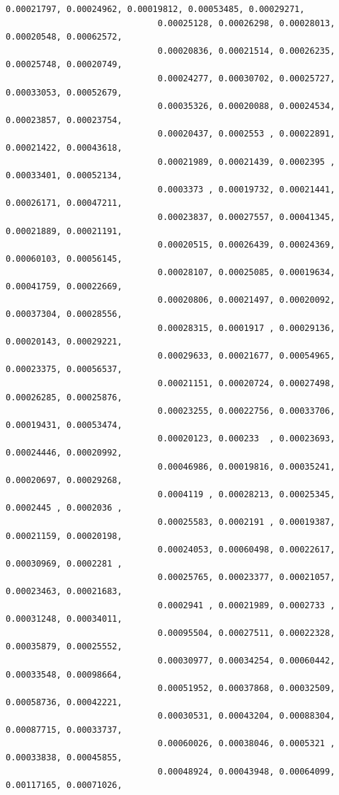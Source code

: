 \documentclass[11pt]{article}
\begin{document}
\begin{Verbatim}[commandchars=\\\{\}]
                              0.00021797, 0.00024962, 0.00019812, 0.00053485, 0.00029271,
                              0.00025128, 0.00026298, 0.00028013, 0.00020548, 0.00062572,
                              0.00020836, 0.00021514, 0.00026235, 0.00025748, 0.00020749,
                              0.00024277, 0.00030702, 0.00025727, 0.00033053, 0.00052679,
                              0.00035326, 0.00020088, 0.00024534, 0.00023857, 0.00023754,
                              0.00020437, 0.0002553 , 0.00022891, 0.00021422, 0.00043618,
                              0.00021989, 0.00021439, 0.0002395 , 0.00033401, 0.00052134,
                              0.0003373 , 0.00019732, 0.00021441, 0.00026171, 0.00047211,
                              0.00023837, 0.00027557, 0.00041345, 0.00021889, 0.00021191,
                              0.00020515, 0.00026439, 0.00024369, 0.00060103, 0.00056145,
                              0.00028107, 0.00025085, 0.00019634, 0.00041759, 0.00022669,
                              0.00020806, 0.00021497, 0.00020092, 0.00037304, 0.00028556,
                              0.00028315, 0.0001917 , 0.00029136, 0.00020143, 0.00029221,
                              0.00029633, 0.00021677, 0.00054965, 0.00023375, 0.00056537,
                              0.00021151, 0.00020724, 0.00027498, 0.00026285, 0.00025876,
                              0.00023255, 0.00022756, 0.00033706, 0.00019431, 0.00053474,
                              0.00020123, 0.000233  , 0.00023693, 0.00024446, 0.00020992,
                              0.00046986, 0.00019816, 0.00035241, 0.00020697, 0.00029268,
                              0.0004119 , 0.00028213, 0.00025345, 0.0002445 , 0.0002036 ,
                              0.00025583, 0.0002191 , 0.00019387, 0.00021159, 0.00020198,
                              0.00024053, 0.00060498, 0.00022617, 0.00030969, 0.0002281 ,
                              0.00025765, 0.00023377, 0.00021057, 0.00023463, 0.00021683,
                              0.0002941 , 0.00021989, 0.0002733 , 0.00031248, 0.00034011,
                              0.00095504, 0.00027511, 0.00022328, 0.00035879, 0.00025552,
                              0.00030977, 0.00034254, 0.00060442, 0.00033548, 0.00098664,
                              0.00051952, 0.00037868, 0.00032509, 0.00058736, 0.00042221,
                              0.00030531, 0.00043204, 0.00088304, 0.00087715, 0.00033737,
                              0.00060026, 0.00038046, 0.0005321 , 0.00033838, 0.00045855,
                              0.00048924, 0.00043948, 0.00064099, 0.00117165, 0.00071026,

\end{Verbatim}
\end{document}
